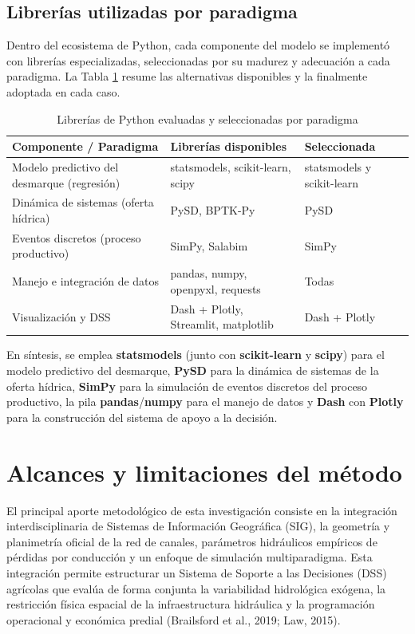 \documentclass[12pt]{report}
\begin{document}
\subsection{Librerías utilizadas por paradigma}

Dentro del ecosistema de Python, cada componente del modelo se implementó con librerías especializadas, seleccionadas por su madurez y adecuación a cada paradigma. La Tabla \ref{tab:librerias} resume las alternativas disponibles y la finalmente adoptada en cada caso.

\begin{table}[H]
\centering
\small
\begin{tabular}{p{4.5cm} p{4.5cm} p{3.5cm}}
\toprule
\textbf{Componente / Paradigma} & \textbf{Librerías disponibles} & \textbf{Seleccionada} \\
\midrule
Modelo predictivo del desmarque (regresión) & statsmodels, scikit-learn, scipy & statsmodels y scikit-learn \\
Dinámica de sistemas (oferta hídrica) & PySD, BPTK-Py & PySD \\
Eventos discretos (proceso productivo) & SimPy, Salabim & SimPy \\
Manejo e integración de datos & pandas, numpy, openpyxl, requests & Todas \\
Visualización y DSS & Dash + Plotly, Streamlit, matplotlib & Dash + Plotly \\
\bottomrule
\end{tabular}
\caption{Librerías de Python evaluadas y seleccionadas por paradigma}
\label{tab:librerias}
\end{table}

En síntesis, se emplea \textbf{statsmodels} (junto con \textbf{scikit-learn} y \textbf{scipy}) para el modelo predictivo del desmarque, \textbf{PySD} para la dinámica de sistemas de la oferta hídrica, \textbf{SimPy} para la simulación de eventos discretos del proceso productivo, la pila \textbf{pandas}/\textbf{numpy} para el manejo de datos y \textbf{Dash} con \textbf{Plotly} para la construcción del sistema de apoyo a la decisión.

\section{Alcances y limitaciones del método}

El principal aporte metodológico de esta investigación consiste en la integración interdisciplinaria de Sistemas de Información Geográfica (SIG), la geometría y planimetría oficial de la red de canales, parámetros hidráulicos empíricos de pérdidas por conducción y un enfoque de simulación multiparadigma. Esta integración permite estructurar un Sistema de Soporte a las Decisiones (DSS) agrícolas que evalúa de forma conjunta la variabilidad hidrológica exógena, la restricción física espacial de la infraestructura hidráulica y la programación operacional y económica predial (Brailsford et al., 2019; Law, 2015).
\end{document}
